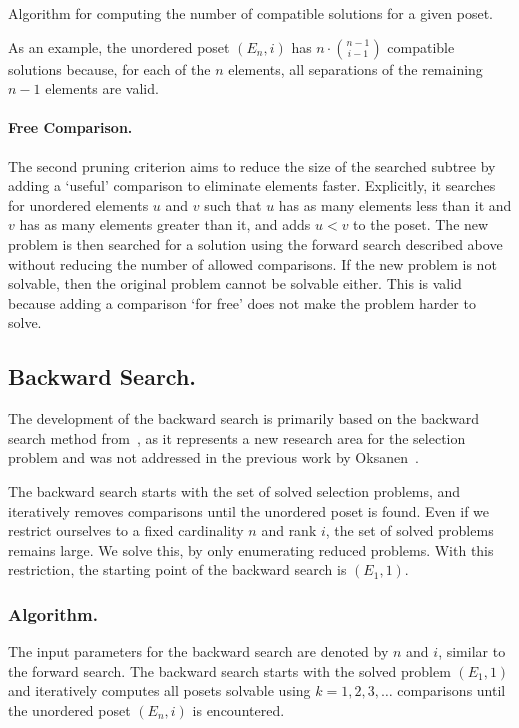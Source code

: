 \documentclass[twoside,leqno,twocolumn]{article}
\begin{document}
\begin{algorithm}[t]
  \centering
  
  \caption{Algorithm for computing the number of compatible solutions for a given poset.}
  \label{algo:compatible_solutions}
\end{algorithm}

As an example, the unordered poset $(E_n, i)$ has $n \cdot \binom{n - 1}{i - 1}$ compatible solutions because, for each of the $n$ elements, all separations of the remaining $n - 1$ elements are valid.


\paragraph{Free Comparison.}
The second pruning criterion aims to reduce the size of the searched subtree by adding a `useful' comparison to eliminate elements faster.
Explicitly, it searches for unordered elements $u$ and $v$ such that $u$ has as many elements less than it and $v$ has as many elements greater than it, and adds $u < v$ to the poset.
The new problem is then searched for a solution using the forward search described above without reducing the number of allowed comparisons.
If the new problem is not solvable, then the original problem cannot be solvable either.
This is valid because adding a comparison `for free' does not make the problem harder to solve.

\subsection{Backward Search.} \label{sec:backward}
The development of the backward search is primarily based on the backward search method from~\cite{stober2022lower}, as it represents a new research area for the selection problem and was not addressed in the previous work by Oksanen~\cite{Oksanen}.

The backward search starts with the set of solved selection problems, and iteratively removes comparisons until the unordered poset is found.
Even if we restrict ourselves to a fixed cardinality $n$ and rank $i$, the set of solved problems remains large.
We solve this, by only enumerating reduced problems.
With this restriction, the starting point of the backward search is $(E_1, 1)$.

\subsubsection{Algorithm.} \label{sec:backward:algorithm}
The input parameters for the backward search are denoted by $n$ and $i$, similar to the forward search.
The backward search starts with the solved problem $(E_1, 1)$ and iteratively computes all posets solvable using $k = 1, 2, 3, \dots$ comparisons until the unordered poset $(E_n, i)$ is encountered.
\end{document}

